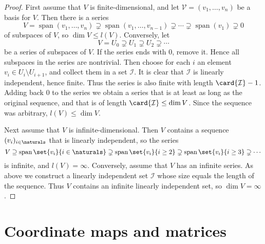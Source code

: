 \documentclass[a4paper, 11pt]{memoir}
\numberwithin{equation}{chapter}
\newcommand{\calM}{\mathcal{M}}
\newcommand{\calL}{\mathcal{L}}
\newcommand{\calV}{\mathcal{V}}
\newcommand{\calI}{\mathcal{I}}
\DeclareMathOperator{\Span}{span}
\begin{document}
\begin{proof}
    First assume that $V$ is finite-dimensional, and let $\calV = (v_1, \ldots, v_n)$ be a basis for $V$. Then there is a series
    \begin{equation*}
        V
            = \Span(v_1, \ldots, v_n)
            \supsetneq \Span(v_1, \ldots, v_{n-1})
            \supsetneq \cdots
            \supsetneq \Span(v_1)
            \supsetneq 0
    \end{equation*}
    of subspaces of $V$, so $\dim V \leq l(V)$. Conversely, let
    \begin{equation*}
        V
            = U_0
            \supsetneq U_1
            \supsetneq U_2
            \supsetneq \cdots
    \end{equation*}
    be a series of subspaces of $V$. If the series ends with $0$, remove it. Hence all subspaces in the series are nontrivial. Then choose for each $i$ an element $v_i \in U_i \setminus U_{i+1}$, and collect them in a set $\calI$. It is clear that $\calI$ is linearly independent, hence finite. Thus the series is also finite with length $\card{\calI}-1$. Adding back $0$ to the series we obtain a series that is at least as long as the original sequence, and that is of length $\card{\calI} \leq \dim V$. Since the sequence was arbitrary, $l(V) \leq \dim V$.

    Next assume that $V$ is infinite-dimensional. Then $V$ contains a sequence $(v_i)_{i\in\naturals}$ that is linearly independent, so the series
    \begin{equation*}
        V
            \supseteq \Span \set{v_i}{i \in \naturals}
            \supsetneq \Span \set{v_i}{i \geq 2}
            \supsetneq \Span \set{v_i}{i \geq 3}
            \supsetneq \cdots
    \end{equation*}
    is infinite, and $l(V) = \infty$. Conversely, assume that $V$ has an infinite series. As above we construct a linearly independent set $\calI$ whose size equals the length of the sequence. Thus $V$ contains an infinite linearly independent set, so $\dim V = \infty$.
\end{proof}




\section{Coordinate maps and matrices}

\newcommand{\coordmap}[1]{\phi_{#1}}
\newcommand{\coordvec}[2]{[#1]_{#2}}
\newcommand{\basischange}[2]{\phi_{#1,#2}}
\newcommand{\mr}[3]{{}_{#1}[#2]_{#3}}
\newcommand{\basischangemat}[2]{\mr{#1}{\square}{#2}}
\newcommand{\lin}{\calL}
\newcommand{\smr}[1]{\calM(#1)} %
\end{document}
